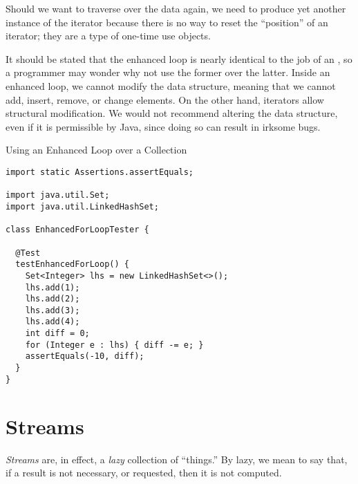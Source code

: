 Should we want to traverse over the data again, we need to produce yet another instance of the iterator because there is no way to reset the ``position'' of an iterator; they are a type of one-time use objects.

It should be stated that the enhanced  loop is nearly identical to the job of an , so a programmer may wonder why not use the former over the latter. Inside an enhanced  loop, we cannot modify the data structure, meaning that we cannot add, insert, remove, or change elements. On the other hand, iterators allow structural modification. We would not recommend altering the data structure, even if it is permissible by Java, since doing so can result in irksome bugs. 


\begin{cl}[]{Using an Enhanced  Loop over a Collection}
\begin{lstlisting}[language=MyJava]
import static Assertions.assertEquals;

import java.util.Set;
import java.util.LinkedHashSet;

class EnhancedForLoopTester {

  @Test
  testEnhancedForLoop() {
    Set<Integer> lhs = new LinkedHashSet<>();
    lhs.add(1);
    lhs.add(2);
    lhs.add(3);
    lhs.add(4);
    int diff = 0;
    for (Integer e : lhs) { diff -= e; }
    assertEquals(-10, diff);
  }
}
\end{lstlisting}
\end{cl}

\section*{Streams}
\textit{Streams} are, in effect, a \textit{lazy} collection of ``things.'' By lazy, we mean to say that, if a result is not necessary, or requested, then it is not computed.


